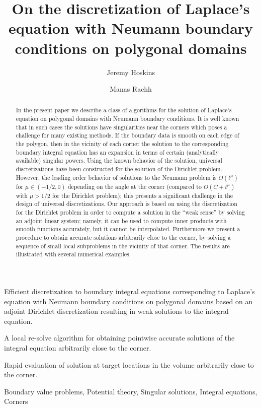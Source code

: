 \documentclass[12pt,times]{elsarticle}
\begin{document}
\begin{frontmatter}

 \title{On the discretization of Laplace's equation with Neumann boundary conditions on polygonal domains}
\author[jh]{Jeremy Hoskins}
\author[mr]{Manas Rachh}
\address[jh]{Applied Mathematics Program, Yale University, USA. \\ email: jeremy.hoskins@yale.edu}
\address[mr]{Center for Computational Mathematics, Flatiron Institute, USA. \\ email: mrachh@flatironinstitute.org}
 
\begin{abstract}
In the present paper we describe a class of algorithms for the solution of Laplace's equation on polygonal domains with Neumann boundary conditions. It is well known that in such cases the solutions have singularities near the corners which poses a challenge for many existing methods. 
If the boundary data is smooth on each edge of the polygon, then in the vicinity of each corner the solution to the corresponding boundary integral equation has an expansion in terms of certain (analytically available) singular powers. Using the known behavior of the solution, universal discretizations have been constructed for the solution of the Dirichlet problem. 
However, the leading order behavior of solutions to the Neumann problem is $O(t^{\mu})$ for $\mu \in (-1/2,0)$ depending on the angle at the corner (compared to $O(C+t^{\mu})$ with $\mu>1/2$ for the Dirichlet problem); this presents a significant challenge in the design of universal discretizations. Our approach is based on using the discretization for the Dirichlet problem in order to compute a solution in the ``weak sense'' by solving an adjoint linear system; namely, it can be used to compute inner products with smooth functions accurately, but it cannot be interpolated.  Furthermore we present a procedure to obtain accurate solutions arbitrarily close to the corner, by solving a sequence of small local subproblems in the vicinity of that corner. The results are illustrated with several numerical examples.
\end{abstract}


\begin{highlights}
\item Efficient discretization to boundary integral equations corresponding to Laplace's equation with Neumann boundary conditions on polygonal domains based on an adjoint Dirichlet discretization resulting
in weak solutions to the integral equation. 
\item A local re-solve algorithm for obtaining pointwise accurate solutions of the integral equation arbitrarily close to the corner.
\item Rapid evaluation of solution at target locations in the volume arbitrarily close to the corner.
\end{highlights}


\begin{keyword}
Boundary value problems, Potential theory, Singular solutions, Integral equations, Corners
\end{keyword}

\end{frontmatter}
\end{document}
